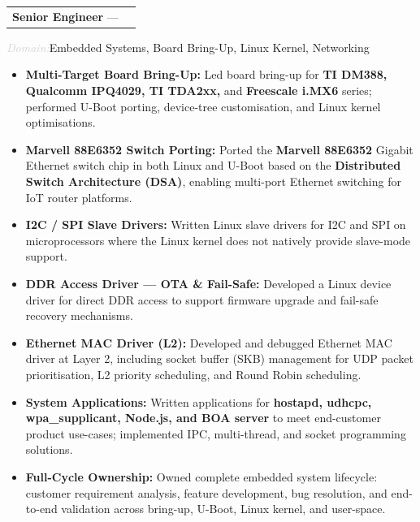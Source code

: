 \documentclass[10pt, a4paper]{article}
\makeatletter
\newcommand{\cventry}[3]{%
  \noindent
  \begin{tabularx}{\linewidth}{@{}X r@{}}
    \textbf{#1} --- \textit{#2} & \textcolor{lightgray}{\small #3}
  \end{tabularx}
  \vspace{2pt}
}
\newcommand{\clientinfo}[2]{%
  \noindent\textcolor{lightgray}{\small\textit{#1:}}\enspace#2\par
}
\makeatother
\begin{document}
\vspace{4pt}

\cventry{Senior Engineer}{\CompanyI{}}{\CompanyIExp{}}
\clientinfo{Domain}{Embedded Systems, Board Bring-Up, Linux Kernel, Networking}

\begin{itemize}
  \item \textbf{Multi-Target Board Bring-Up:}
        Led board bring-up for \textbf{TI DM388, Qualcomm IPQ4029, TI TDA2xx,}
        and \textbf{Freescale i.MX6} series; performed U-Boot porting,
        device-tree customisation, and Linux kernel optimisations.

  \item \textbf{Marvell 88E6352 Switch Porting:}
        Ported the \textbf{Marvell 88E6352} Gigabit Ethernet switch chip in both
        Linux and U-Boot based on the \textbf{Distributed Switch Architecture (DSA)},
        enabling multi-port Ethernet switching for IoT router platforms.

  \item \textbf{I2C / SPI Slave Drivers:}
        Written Linux slave drivers for I2C and SPI on microprocessors where
        the Linux kernel does not natively provide slave-mode support.

  \item \textbf{DDR Access Driver --- OTA \& Fail-Safe:}
        Developed a Linux device driver for direct DDR access to support
        firmware upgrade and fail-safe recovery mechanisms.

  \item \textbf{Ethernet MAC Driver (L2):}
        Developed and debugged Ethernet MAC driver at Layer 2, including
        socket buffer (SKB) management for UDP packet prioritisation,
        L2 priority scheduling, and Round Robin scheduling.

  \item \textbf{System Applications:}
        Written applications for \textbf{hostapd, udhcpc, wpa\_supplicant,
        Node.js, and BOA server} to meet end-customer product use-cases;
        implemented IPC, multi-thread, and socket programming solutions.

  \item \textbf{Full-Cycle Ownership:}
        Owned complete embedded system lifecycle: customer requirement
        analysis, feature development, bug resolution, and end-to-end
        validation across bring-up, U-Boot, Linux kernel, and user-space.
\end{itemize}
\end{document}
